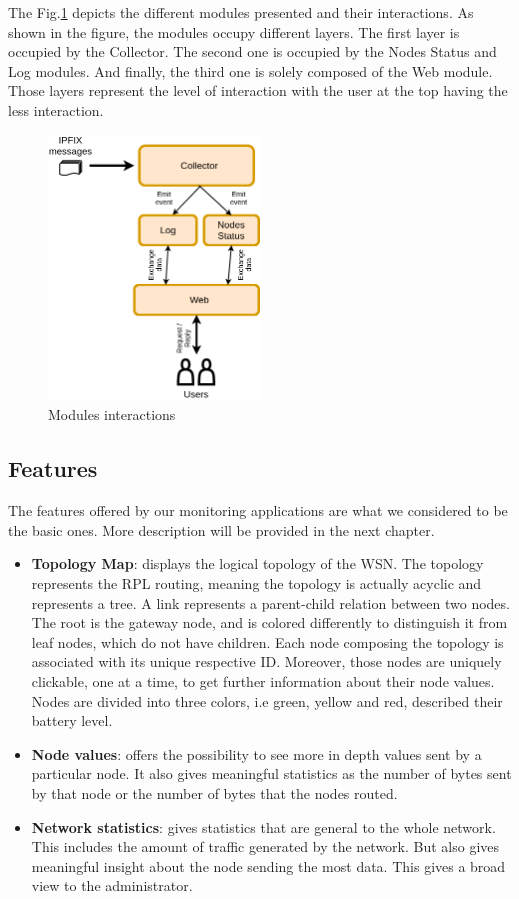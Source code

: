 The Fig.\ref{fig:modules} depicts the different modules presented and their interactions. As shown in the figure, the modules occupy different layers. The first layer is occupied by the Collector. The second one is occupied by the Nodes Status and Log modules. And finally, the third one is solely composed of the Web module. Those layers represent the level of interaction with the user at the top having the less interaction.

\begin{figure}
	\centering
	\includegraphics[width=0.5\textwidth]{res/modules.png}
	\caption{Modules interactions}
	\label{fig:modules}
\end{figure}

\subsection{Features}

The features offered by our monitoring applications are what we considered to be the basic ones. More description will be provided in the next chapter.

\begin{itemize}
	\item \textbf{Topology Map}: displays the logical topology of the WSN. The topology represents the RPL routing, meaning the topology is actually acyclic and represents a tree. A link represents a parent-child relation between two nodes. The root is the gateway node, and is colored differently to distinguish it from leaf nodes, which do not have children. Each node composing the topology is associated with its unique respective ID. Moreover, those nodes are uniquely clickable, one at a time, to get further information about their node values. Nodes are divided into three colors, i.e green, yellow and red, described their battery level.
	\item \textbf{Node values}: offers the possibility to see more in depth values sent by a particular node. It also gives meaningful statistics as the number of bytes sent by that node or the number of bytes that the nodes routed.
	\item \textbf{Network statistics}: gives statistics that are general to the whole network. This includes the amount of traffic generated by the network. But also gives meaningful insight about the node sending the most data. This gives a broad view to the administrator.
\end{itemize}

